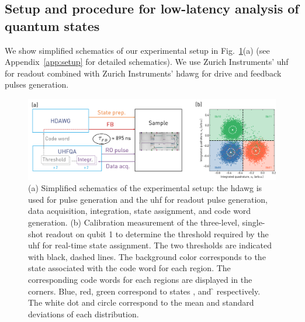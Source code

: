 \subsection{Setup and procedure for low-latency analysis of quantum states}
We show simplified schematics of our experimental setup in Fig.~\ref{fig:readout_active_reset_schematics}(a) (see Appendix~\ref{app:setup} for detailed schematics). We use Zurich Instruments' \gls{uhf} for readout combined with Zurich Instruments' \gls{hdawg} for drive and feedback pulses generation.

\begin{figure}
    \centering
    \includegraphics[width=\textwidth]{appendices/qutrit_readout/figs/ch3_readout_active_reset_setup.png}
    \caption{(a) Simplified schematics of the experimental setup: the \gls{hdawg} is used for pulse generation and the \gls{uhf} for readout pulse generation, data acquisition, integration, state assignment, and code word generation. (b) Calibration measurement of the three-level, single-shot readout on qubit 1 to determine the threshold required by the \gls{uhf} for real-time state assignment. The two thresholds are indicated with black, dashed lines. The background color corresponds to the state associated with the code word for each region. The corresponding code words for each regions are displayed in the corners. Blue, red, green correspond to states \g, \e and \f{} respectively. The white dot and circle correspond to the mean and standard deviations of each distribution.}
    \label{fig:readout_active_reset_schematics}
\end{figure}{}

